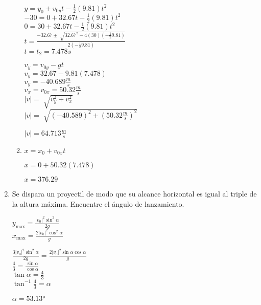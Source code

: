 \documentclass[10pt, a4paper]{article}
\begin{document}
\begin{enumerate}
\begin{enumerate}
\begin{center}
            $y= y_0 + v_{0y}t-\frac{1}{2}(9.81)t^2$\\
            $-30= 0 + 32.67t-\frac{1}{2}(9.81)t^2$\\
            $0 = 30 + 32.67t-\frac{1}{2}(9.81)t^2$\\
            $t= \frac{-32.67 \pm \sqrt[]{32.67^2-4(30)(-\frac{1}{2}9.81)}}{2(-\frac{1}{2}9.81)}$\\
            $t=t_2=7.478 \si{s}$

            $v_y=v_{0y}-gt$\\
            $v_y=32.67-9.81(7.478)$\\
            $v_y=-40.689 \si{\frac{m}{s}}$\\
            $v_x=v_{0x}=50.32 \si{\frac{m}{s}}$\\
            $|v|=\sqrt[]{v_y^2+v_x^2}$\\
            $|v|=\sqrt[]{(-40.589)^2+(50.32\si{\frac{m}{s}})^2}$

            $|v|=64.713 \si{\frac{m}{s}}$
        \end{center}
        \item 
        \begin{center}
            $x=x_0+v_{0x}t$

            $x=0+50.32(7.478)$

            $x=376.29$
        \end{center}
    \end{enumerate}

    \item Se dispara un proyectil de modo que su alcance horizontal es igual al triple de
    la altura máxima. Encuentre el ángulo de lanzamiento.

    \begin{center}
        $y_{\text{max}}=\frac{|v_0|^2\sin^2{\alpha}}{2g}$\\
        $x_{\text{max}}=\frac{2|v_0|^2\cos^2{\alpha}}{g}$

        $\frac{3|v_0|^2\sin^2{\alpha}}{2g}=\frac{2|v_0|^2\sin\alpha\cos{\alpha}}{g}$\\
        $\frac{4}{3}=\frac{\sin\alpha}{\cos\alpha}$\\
        $\tan\alpha=\frac{4}{3}$\\
        $\tan^{-1}\frac{4}{3}=\alpha$

        $\alpha=\ang{53.13}$

        

    \end{center}


\end{enumerate}
\end{document}
